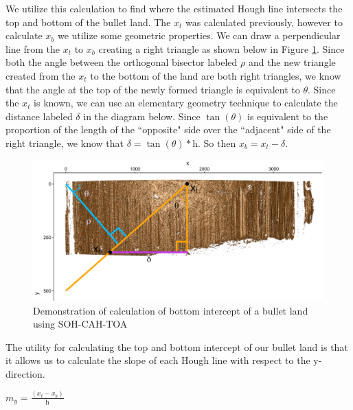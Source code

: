 \documentclass[12pt]{article}\usepackage[]{graphicx}\usepackage[]{color}
\newenvironment{knitrout}{}{} %
\theoremstyle{nonumberplain}
\begin{document}
We utilize this calculation to find where the estimated Hough line intersects the top and bottom of the bullet land. The $x_t$ was calculated previously, however to calculate $x_b$ we utilize some geometric properties. We can draw a perpendicular line from the $x_t$ to $x_b$ creating a right triangle as shown below in Figure \ref{fig:xbottom-graphic-inclusion}. Since both the angle between the orthogonal bisector labeled $\rho$ and the new triangle created from the $x_t$ to the bottom of the land are both right triangles, we know that the angle at the top of the newly formed triangle is equivalent to $\theta$. Since the $x_t$ is known, we can use an elementary geometry technique to calculate the distance labeled $\delta$ in the diagram below. Since $\tan(\theta)$ is equivalent to the proportion of the length of the ``opposite" side over the ``adjacent" side of the right triangle, we know that $\delta = \tan(\theta)*\text{h}$. So then $x_b = x_t - \delta$. 



\begin{knitrout}
\color{fgcolor}\begin{figure}[H]

{\centering \includegraphics[width=0.8\linewidth]{../images/calc-xbottom} 

}

\caption[Demonstration of calculation of bottom intercept of a bullet land using SOH-CAH-TOA]{Demonstration of calculation of bottom intercept of a bullet land using SOH-CAH-TOA}\label{fig:xbottom-graphic-inclusion}
\end{figure}


\end{knitrout}

The utility for calculating the top and bottom intercept of our bullet land is that it allows us to calculate the slope of each Hough line with respect to the y-direction. 
\begin{center}
 $m_y = \frac{(x_t - x_b)}{\text{h}}$
\end{center}
\end{document}

